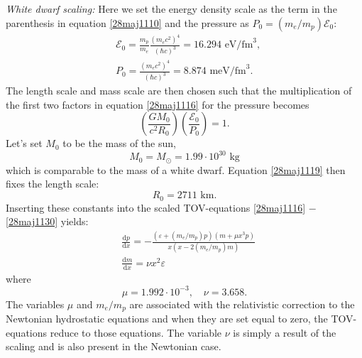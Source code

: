 \documentclass[twocolumn]{article}
\begin{document}
\begin{large}
\textit{White dwarf scaling:} Here we set the energy density scale as the term in the parenthesis in equation \eqref{28maj1110} and the pressure as $P_0 = (m_e/m_p)\mathcal{E}_0$:
\begin{equation}
\begin{split}
    &\mathcal{E}_0 = \frac{m_p}{m_e}\frac{(m_ec^2)^4}{(\hbar c)^3} = 16.294\text{ eV/fm}^3 , \\ 
    &P_0 = \frac{(m_ec^2)^4}{(\hbar c)^3} = 8.874\text{ meV/fm}^3.
    \end{split}
\end{equation}
The length scale and mass scale are then chosen such that the multiplication of the first two factors in equation \eqref{28maj1116} for the pressure becomes
\begin{equation}
    \label{28maj1119}
    \left(\frac{GM_0}{c^2R_0}\right)\left(\frac{\mathcal{E}_0}{P_0}\right) = 1.
\end{equation}
Let's set $M_0$ to be the mass of the sun, 
\begin{equation}
    M_0 = M_\odot = 1.99\cdot 10^{30} \text{ kg}
\end{equation}
which is comparable to the mass of a white dwarf. Equation \eqref{28maj1119} then fixes the length scale:
\begin{equation}
    R_0 = 2711 \text{ km}.
\end{equation}
Inserting these constants into the scaled TOV-equations \eqref{28maj1116} $-$ \eqref{28maj1130} yields:
\begin{equation}
    \begin{split}
        &\frac{\text{d}p}{\text{d}x} = -\frac{(\varepsilon + (m_e/m_p)p)(m+\mu x^3p)}{x(x-2(m_e/m_p)m)} \\ 
        &\frac{\text{d}m}{\text{d}x} = \nu x^2\varepsilon
    \end{split}
\end{equation}
where 
\begin{equation}
    \mu = 1.992\cdot 10^{-3},\quad \nu = 3.658.
\end{equation}
The variables $\mu$ and $m_e/m_p$ are associated with the relativistic correction to the Newtonian hydrostatic equations and when they are set equal to zero, the TOV-equations reduce to those equations. The variable $\nu$ is simply a result of the scaling and is also present in the Newtonian case.


\end{large}
\end{document}
